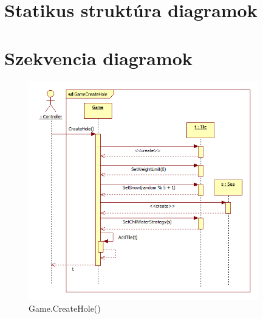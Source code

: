 \section{Statikus struktúra diagramok}

\newpage
\section{Szekvencia diagramok}
\begin{figure}[H]
	\begin{center}
		\includegraphics[width=10cm]{chapters/chapter03/seqdiag/Game_CreateHole.png}
		\caption{Game.CreateHole()}
		\label{fig:GameCreateHole}
	\end{center}
\end{figure}
